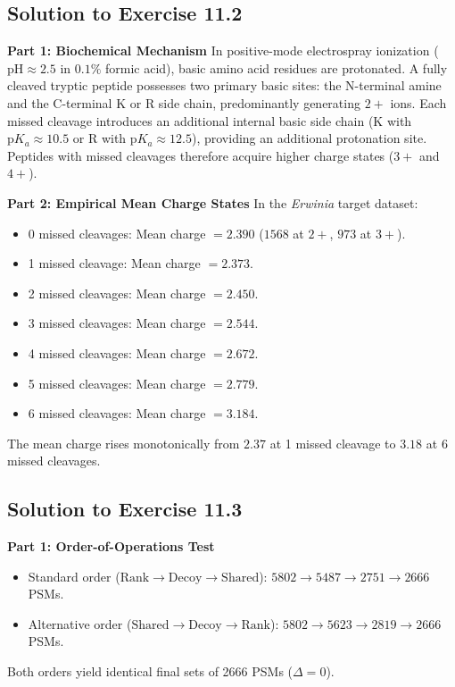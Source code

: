 \documentclass[11pt,twoside,openright]{book}
\begin{document}
\subsection{Solution to Exercise 11.2}

\noindent\textbf{Part 1: Biochemical Mechanism}\enspace
In positive-mode electrospray ionization ($\text{pH} \approx 2.5$ in $0.1\%$ formic acid), basic amino acid residues are protonated. A fully cleaved tryptic peptide possesses two primary basic sites: the N-terminal amine and the C-terminal $\text{K}$ or $\text{R}$ side chain, predominantly generating $2+$ ions. Each missed cleavage introduces an additional internal basic side chain ($\text{K}$ with $\text{p}K_a \approx 10.5$ or $\text{R}$ with $\text{p}K_a \approx 12.5$), providing an additional protonation site. Peptides with missed cleavages therefore acquire higher charge states ($3+$ and $4+$).

\noindent\textbf{Part 2: Empirical Mean Charge States}\enspace
In the \textit{Erwinia} target dataset:
\begin{itemize}
    \item 0 missed cleavages: Mean charge $= 2.390$ ($1568$ at $2+$, $973$ at $3+$).
    \item 1 missed cleavage: Mean charge $= 2.373$.
    \item 2 missed cleavages: Mean charge $= 2.450$.
    \item 3 missed cleavages: Mean charge $= 2.544$.
    \item 4 missed cleavages: Mean charge $= 2.672$.
    \item 5 missed cleavages: Mean charge $= 2.779$.
    \item 6 missed cleavages: Mean charge $= 3.184$.
\end{itemize}
The mean charge rises monotonically from $2.37$ at 1 missed cleavage to $3.18$ at 6 missed cleavages.

\subsection{Solution to Exercise 11.3}

\noindent\textbf{Part 1: Order-of-Operations Test}\enspace
\begin{itemize}
    \item Standard order ($\text{Rank} \to \text{Decoy} \to \text{Shared}$): $5802 \to 5487 \to 2751 \to 2666$ PSMs.
    \item Alternative order ($\text{Shared} \to \text{Decoy} \to \text{Rank}$): $5802 \to 5623 \to 2819 \to 2666$ PSMs.
\end{itemize}
Both orders yield identical final sets of 2666 PSMs ($\Delta = 0$).
\end{document}
